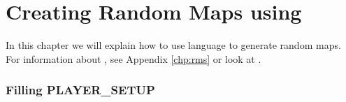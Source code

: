 \chapter{Creating Random Maps using }

In this chapter we will explain how to use  language to generate random maps. For information about , see Appendix \ref{chp:rms} or look at \cite{zetnus:2019}. %

\subsection{Filling PLAYER\_SETUP}
